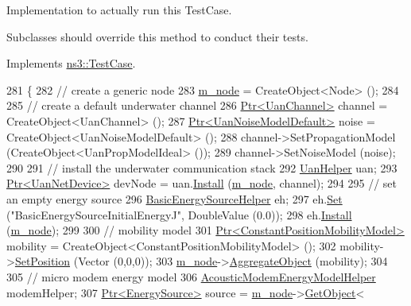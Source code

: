 Implementation to actually run this Test\+Case. 

Subclasses should override this method to conduct their tests. 

Implements \hyperlink{classns3_1_1TestCase_a8ff74680cf017ed42011e4be51917a24}{ns3\+::\+Test\+Case}.


\begin{DoxyCode}
281 \{
282   \textcolor{comment}{// create a generic node}
283   \hyperlink{classAcousticModemEnergyDepletionTestCase_aad8287a51fe09423d58935484fb3ac6d}{m\_node} = CreateObject<Node> ();
284 
285   \textcolor{comment}{// create a default underwater channel}
286   \hyperlink{classns3_1_1Ptr}{Ptr<UanChannel>} channel = CreateObject<UanChannel> ();
287   \hyperlink{classns3_1_1Ptr}{Ptr<UanNoiseModelDefault>} noise = CreateObject<UanNoiseModelDefault> ();
288   channel->SetPropagationModel (CreateObject<UanPropModelIdeal> ());
289   channel->SetNoiseModel (noise);
290 
291   \textcolor{comment}{// install the underwater communication stack}
292   \hyperlink{classns3_1_1UanHelper}{UanHelper} uan;
293   \hyperlink{classns3_1_1Ptr}{Ptr<UanNetDevice>} devNode = uan.\hyperlink{classns3_1_1UanHelper_a283475798bb2df2ff11c53b68d2f1361}{Install} (\hyperlink{classAcousticModemEnergyDepletionTestCase_aad8287a51fe09423d58935484fb3ac6d}{m\_node}, channel);
294 
295   \textcolor{comment}{// set an empty energy source}
296   \hyperlink{classns3_1_1BasicEnergySourceHelper}{BasicEnergySourceHelper} eh;
297   eh.\hyperlink{classns3_1_1BasicEnergySourceHelper_aa07c8c1c4a4ced92b8fc51bf4be4de3f}{Set} (\textcolor{stringliteral}{"BasicEnergySourceInitialEnergyJ"}, DoubleValue (0.0));
298   eh.\hyperlink{classns3_1_1EnergySourceHelper_ac52e48ef79c83537cc0bba02df8d91a1}{Install} (\hyperlink{classAcousticModemEnergyDepletionTestCase_aad8287a51fe09423d58935484fb3ac6d}{m\_node});
299 
300   \textcolor{comment}{// mobility model}
301   \hyperlink{classns3_1_1Ptr}{Ptr<ConstantPositionMobilityModel>} mobility = 
      CreateObject<ConstantPositionMobilityModel> ();
302   mobility->\hyperlink{classns3_1_1MobilityModel_ac584b3d5a309709d2f13ed6ada1e7640}{SetPosition} (Vector (0,0,0));
303   \hyperlink{classAcousticModemEnergyDepletionTestCase_aad8287a51fe09423d58935484fb3ac6d}{m\_node}->\hyperlink{classns3_1_1Object_a79dd435d300f3deca814553f561a2922}{AggregateObject} (mobility);
304 
305   \textcolor{comment}{// micro modem energy model}
306   \hyperlink{classns3_1_1AcousticModemEnergyModelHelper}{AcousticModemEnergyModelHelper} modemHelper;
307   \hyperlink{classns3_1_1Ptr}{Ptr<EnergySource>} source = \hyperlink{classAcousticModemEnergyDepletionTestCase_aad8287a51fe09423d58935484fb3ac6d}{m\_node}->\hyperlink{classns3_1_1Object_a13e18c00017096c8381eb651d5bd0783}{GetObject}<

\end{DoxyCode}
